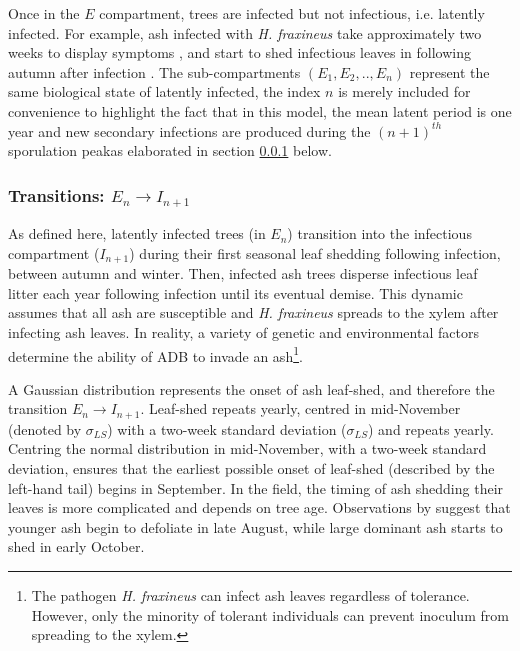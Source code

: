 Once in the $E$ compartment, trees are infected but not infectious, i.e. latently infected.
For example, ash infected with \textit{H. fraxineus} take approximately two weeks to display 
symptoms \cite{https://doi.org/10.1111/ppa.12048, https://doi.org/10.1111/ppa.12844},
and start to shed infectious leaves in following autumn after infection \cite{gross2014h}.
The sub-compartments $(E_1, E_2,..,E_n)$ represent the same biological state of latently infected,
the index $n$ is merely included for convenience to highlight the fact that in this model, 
the mean latent period is one year and new secondary infections are produced during the $(n+1)^{th}$ sporulation peak\textemdash as elaborated in section \ref{sec:En-In+1} below.

\subsubsection{Transitions: $E_n\rightarrow I_{n+1}$}
\label{sec:En-In+1}

As defined here, latently infected trees (in $E_n$) transition into the infectious compartment ($I_{n+1}$) during their 
first seasonal leaf shedding following infection, between autumn and winter.
Then, infected ash trees disperse infectious leaf litter each year following infection until its eventual demise. 
This dynamic assumes that all ash are susceptible and \textit{H. fraxineus} spreads to the xylem after infecting ash leaves.
In reality, a variety of genetic and environmental factors determine the ability of ADB to invade an ash\footnote{
The pathogen \textit{H. fraxineus} can infect ash leaves regardless of tolerance. 
However, only the minority of tolerant individuals can prevent inoculum from spreading to the xylem.}.

A Gaussian distribution represents the onset of ash leaf-shed, and therefore the transition $E_n\rightarrow I_{n+1}$.
Leaf-shed repeats yearly, centred in mid-November (denoted by $\sigma_{LS}$) with a two-week standard deviation ($\sigma_{LS}$) 
and repeats yearly. Centring the normal distribution in mid-November, with a two-week standard deviation, ensures that the earliest
possible onset of leaf-shed (described by the left-hand tail) begins in September.
In the field, the timing of ash shedding their leaves is more complicated and depends on tree age. 
Observations by \cite{hietala2013invasive} suggest that younger ash begin to defoliate in late August,
while large dominant ash starts to shed in early October.

